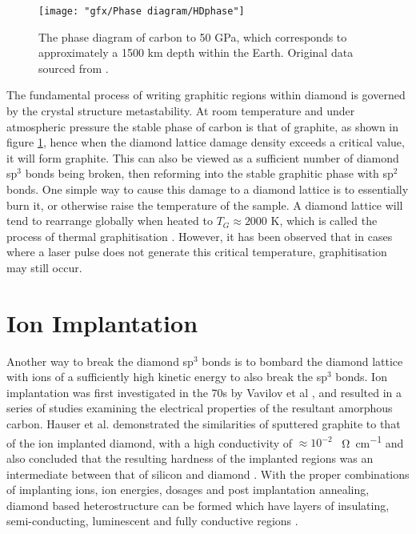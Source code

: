 \begin{figure}
	\centering
	\texttt{[image: "gfx/Phase diagram/HDphase"]}
	\caption{The phase diagram of carbon to 50 \si{\giga\pascal}, which corresponds to approximately a 1500 \si{\kilo\metre} depth within the Earth. Original data sourced from \cite{blank:2018}.}
	\label{fig:phase}
\end{figure}

The fundamental process of writing graphitic regions within diamond is governed by the crystal structure metastability. At room temperature and under atmospheric pressure the stable phase of carbon is that of graphite, as shown in figure \ref{fig:phase}, hence when the diamond lattice damage density exceeds a critical value, it will form graphite. This can also be viewed as a sufficient number of diamond sp$^{3}$ bonds being broken, then reforming into the stable graphitic phase with sp$^{2}$ bonds. One simple way to cause this damage to a diamond lattice is to essentially burn it, or otherwise raise the temperature of the sample. A diamond lattice will tend to rearrange globally when heated to $T_{G} \approx 2000$ \si{\kelvin}, which is called the process of thermal graphitisation \cite{davies:1972}. However, it has been observed that in cases where a laser pulse does not generate this critical temperature, graphitisation may still occur. 

\section{Ion Implantation}
Another way to break the diamond sp$^{3}$ bonds is to bombard the diamond lattice with ions of a sufficiently high kinetic energy to also break the sp$^{3}$ bonds. Ion implantation was first investigated in the 70s by Vavilov et al \cite{vavilov:1973}, and resulted in a series of studies examining the electrical properties of the resultant amorphous carbon. Hauser et al. demonstrated the similarities of sputtered graphite to that of the ion implanted diamond, with a high conductivity of $\approx10^{-2}$ \si{\per\ohm\per\centi\metre} and also concluded that the resulting hardness of the implanted regions was an intermediate between that of silicon and diamond \cite{hauser:1976,hauser:1977}. With the proper combinations of implanting ions, ion energies, dosages and post implantation annealing, diamond based heterostructure can be formed which have layers of insulating, semi-conducting, luminescent and fully conductive regions \cite{gippius:1999,prins:1983,prins:1985}. 

